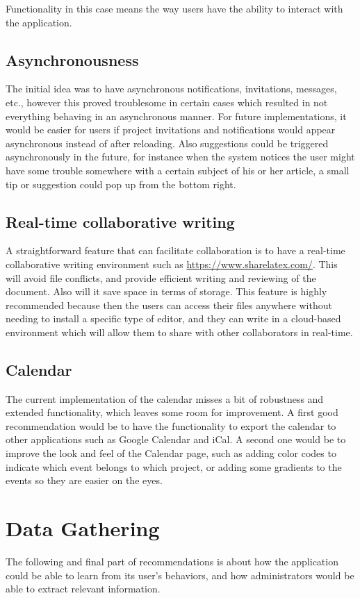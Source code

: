 Functionality in this case means the way users have the ability to interact with the application.

\subsection{Asynchronousness}
The initial idea was to have asynchronous notifications, invitations, messages, etc., however this proved troublesome in certain cases which resulted in not everything behaving in an asynchronous manner. For future implementations, it would be easier for users if project invitations and notifications would appear asynchronous instead of after reloading. Also suggestions could be triggered asynchronously in the future, for instance when the system notices the user might have some trouble somewhere with a certain subject of his or her article, a small tip or suggestion could pop up from the bottom right.

\subsection{Real-time collaborative writing } %
A straightforward feature that can facilitate collaboration is to have a real-time collaborative writing environment such as \url{https://www.sharelatex.com/}. This will avoid file conflicts, and provide efficient writing and reviewing of the document. Also will it save space in terms of storage. This feature is highly recommended because then the users can access their files anywhere without needing to install a specific type of editor, and they can write in a cloud-based environment which will allow them to share with other collaborators in real-time. 


\subsection{Calendar}
The current implementation of the calendar misses a bit of robustness and extended functionality, which leaves some room for improvement. A first good recommendation would be to have the functionality to export the calendar to other applications such as Google Calendar and iCal. A second one would be to improve the look and feel of the Calendar page, such as adding color codes to indicate which event belongs to which project, or adding some gradients to the events so they are easier on the eyes.

\section{Data Gathering}
The following and final part of recommendations is about how the application could be able to learn from its user's behaviors, and how administrators would be able to extract relevant information.

